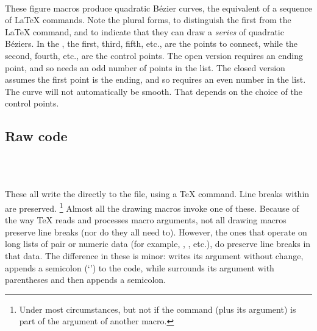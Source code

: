 \documentclass[letterpaper]{article}
\begin{document}
\begin{cd}
  \\
%
\end{cd}

These figure macros produce quadratic B\'ezier curves, the equivalent of
a sequence of \LaTeX{}  commands. Note the plural forms, to
distinguish the first from the \LaTeX{} command, and to indicate that
they can draw a \emph{series} of quadratic B\'eziers. In the
, the first, third, fifth, etc., are the points to connect,
while the second, fourth, etc., are the control points. The open version
requires an ending point, and so needs an odd number of points in the
list. The closed version assumes the first point is the ending, and so
requires an even number in the list. The curve will not automatically be
smooth. That depends on the choice of the control points.

\subsection{Raw \MF{} code}\label{mfcode}

\begin{cd}
\\
\\
%
%
%
%
\end{cd}

These all write the  directly to the \MF{} file,
using a \TeX{}  command. Line breaks within  are preserved.%
    \footnote{Under most circumstances, but not if the command (plus its
    argument) is part of the argument of another macro.} %
Almost all the \mfp{} drawing macros invoke one of these. Because of the
way \TeX{} reads and processes macro arguments, not all drawing macros
preserve line breaks (nor do they all need to). However, the ones that
operate on long lists of pair or numeric data (for example, ,
, etc.), do preserve line breaks in that data. The difference
in these is minor:  writes its argument without change,
 appends a semicolon (`\mfc{;}') to the code, while
 surrounds its argument with parentheses and then appends a
semicolon.
\end{document}
